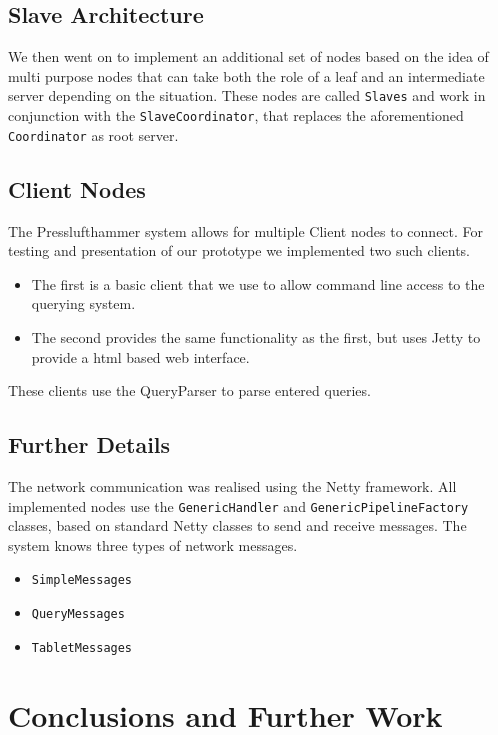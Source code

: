   \subsection{Slave Architecture}
    We then went on to implement an additional set of nodes based on the
    idea of multi purpose nodes that can take both the role of a leaf
    and an intermediate server depending on the situation.
    These nodes are called \texttt{Slaves} and work in conjunction with the
    \texttt{SlaveCoordinator}, that replaces the aforementioned 
    \texttt{Coordinator} as root server.
  \subsection{Client Nodes}
    The Presslufthammer system allows for multiple Client nodes to connect.
    For testing and presentation of our prototype we implemented two such
    clients.
    \begin{itemize}
      \item The first is a basic client that we use to allow command
            line access to the querying system.
      \item The second provides the same functionality as the first,
            but uses Jetty \cite{jetty} to provide a html based web
            interface.
    \end{itemize}
    These clients use the QueryParser to parse entered queries.
  \subsection{Further Details}
    The network communication was realised using the Netty framework.
    All implemented nodes use the \texttt{GenericHandler} and
    \texttt{GenericPipelineFactory} classes, based on standard Netty classes
    to send and receive messages.
    The system knows three types of network messages.
    \begin{itemize}
      \item \texttt{SimpleMessages}
      \item \texttt{QueryMessages}
      \item \texttt{TabletMessages}
    \end{itemize}
    

\section{Conclusions and Further Work}
